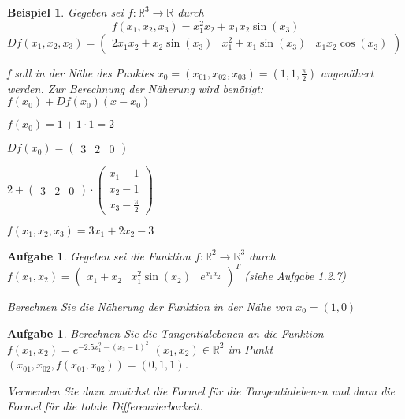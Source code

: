 \documentclass[12pt,a4paper]{scrreprt}
\newtheorem{beispiel}[defi]{Beispiel}
\newtheorem{aufg}[defi]{Aufgabe}
\begin{document}
\begin{beispiel}
	Gegeben sei $f:\mathbb{R}^3\to\mathbb{R}$ durch
	\[f(x_1,x_2,x_3)=x_1^2x_2+x_1x_2\sin(x_3)\]
	$Df(x_1,x_2,x_3)=\begin{pmatrix}
	2x_1x_2+x_2\sin(x_3) & x_1^2+x_1\sin(x_3) & x_1x_2\cos(x_3)
	\end{pmatrix}$
	
	f soll in der Nähe des Punktes $x_0=(x_{01},x_{02},x_{03})=(1,1,\frac{\pi}{2})$ angenähert werden. Zur Berechnung der Näherung wird benötigt: $f(x_0)+Df(x_0)(x-x_0)$
	
	$f(x_0)=1+1\cdot1=2$
	
	$Df(x_0)=\begin{pmatrix}3 & 2 & 0\end{pmatrix}$
	
	$2+\begin{pmatrix}3 & 2 & 0\end{pmatrix}\cdot\begin{pmatrix}
	x_1 - 1 \\
	x_2 - 1 \\
	x_3 - \frac{\pi}{2}
	\end{pmatrix}$
	
	$f(x_1,x_2,x_3)=3x_1+2x_2-3$
\end{beispiel}

\begin{aufg}
Gegeben sei die Funktion $f:\mathbb{R}^2\to\mathbb{R}^3$ durch $f(x_1,x_2)=\begin{pmatrix}x_1+x_2 & x_1^2\sin(x_2) & e^{x_1x_2}\end{pmatrix}^T$ (siehe Aufgabe 1.2.7)

	Berechnen Sie die Näherung der Funktion in der Nähe von $x_0=(1,0)$
\end{aufg}

\begin{aufg}
	Berechnen Sie die Tangentialebenen an die Funktion $f(x_1,x_2)=e^{-2.5x_1^2-(x_3-1)^2}$ $(x_1,x_2)\in\mathbb{R}^2$ im Punkt $(x_{01},x_{02},f(x_{01},x_{02}))=(0,1,1)$.

	Verwenden Sie dazu zunächst die Formel für die Tangentialebenen und dann die Formel für die totale Differenzierbarkeit.
\end{aufg}
\end{document}
